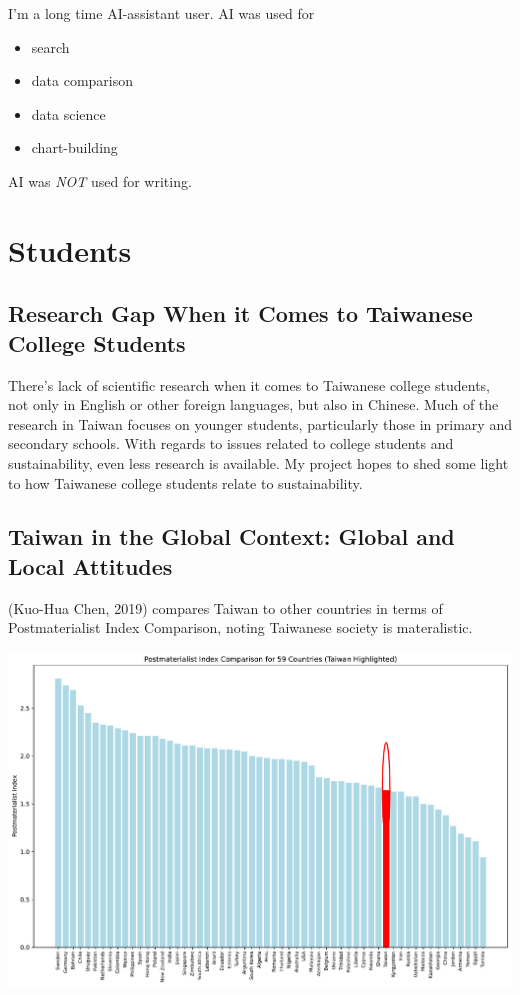 \documentclass[
  letterpaper,
  DIV=11,
  numbers=noendperiod]{scrartcl}
\providecommand{\tightlist}{%
  \setlength{\itemsep}{0pt}\setlength{\parskip}{0pt}}\usepackage{longtable,booktabs,array}
\begin{document}
I'm a long time AI-assistant user. AI was used for

\begin{itemize}
\tightlist
\item
  search
\item
  data comparison
\item
  data science
\item
  chart-building
\end{itemize}

AI was \emph{NOT} used for writing.

\newpage

\section{Students}\label{students}

\subsection{Research Gap When it Comes to Taiwanese College
Students}\label{research-gap-when-it-comes-to-taiwanese-college-students}

There's lack of scientific research when it comes to Taiwanese college
students, not only in English or other foreign languages, but also in
Chinese. Much of the research in Taiwan focuses on younger students,
particularly those in primary and secondary schools. With regards to
issues related to college students and sustainability, even less
research is available. My project hopes to shed some light to how
Taiwanese college students relate to sustainability.

\subsection{Taiwan in the Global Context: Global and Local
Attitudes}\label{taiwan-in-the-global-context-global-and-local-attitudes}

(Kuo-Hua Chen, 2019) compares Taiwan to other countries in terms of
Postmaterialist Index Comparison, noting Taiwanese society is
materalistic.

\includegraphics{_thesis_files/figure-pdf/cell-4-output-1.pdf}
\end{document}
